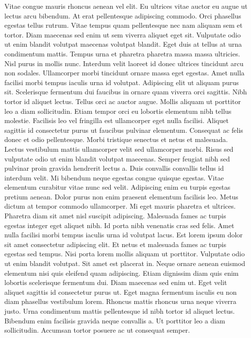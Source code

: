 Vitae congue mauris rhoncus aenean vel elit. Eu ultrices vitae auctor eu augue ut lectus arcu bibendum. At erat pellentesque adipiscing commodo. Orci phasellus egestas tellus rutrum. Vitae tempus quam pellentesque nec nam aliquam sem et tortor. Diam maecenas sed enim ut sem viverra aliquet eget sit. Vulputate odio ut enim blandit volutpat maecenas volutpat blandit. Eget duis at tellus at urna condimentum mattis. Tempus urna et pharetra pharetra massa massa ultricies. Nisl purus in mollis nunc. Interdum velit laoreet id donec ultrices tincidunt arcu non sodales.
Ullamcorper morbi tincidunt ornare massa eget egestas. Amet nulla facilisi morbi tempus iaculis urna id volutpat. Adipiscing elit ut aliquam purus sit. Scelerisque fermentum dui faucibus in ornare quam viverra orci sagittis. Nibh tortor id aliquet lectus. Tellus orci ac auctor augue. Mollis aliquam ut porttitor leo a diam sollicitudin. Etiam tempor orci eu lobortis elementum nibh tellus molestie. Facilisis leo vel fringilla est ullamcorper eget nulla facilisi. Aliquet sagittis id consectetur purus ut faucibus pulvinar elementum.
Consequat ac felis donec et odio pellentesque. Morbi tristique senectus et netus et malesuada. Lectus vestibulum mattis ullamcorper velit sed ullamcorper morbi. Risus sed vulputate odio ut enim blandit volutpat maecenas. Semper feugiat nibh sed pulvinar proin gravida hendrerit lectus a. Duis convallis convallis tellus id interdum velit. Mi bibendum neque egestas congue quisque egestas. Vitae elementum curabitur vitae nunc sed velit. Adipiscing enim eu turpis egestas pretium aenean. Dolor purus non enim praesent elementum facilisis leo. Metus dictum at tempor commodo ullamcorper. Mi eget mauris pharetra et ultrices. Pharetra diam sit amet nisl suscipit adipiscing. Malesuada fames ac turpis egestas integer eget aliquet nibh.
Id porta nibh venenatis cras sed felis. Amet nulla facilisi morbi tempus iaculis urna id volutpat lacus. Est lorem ipsum dolor sit amet consectetur adipiscing elit. Et netus et malesuada fames ac turpis egestas sed tempus. Nisi porta lorem mollis aliquam ut porttitor. Vulputate odio ut enim blandit volutpat. Sit amet est placerat in. Neque ornare aenean euismod elementum nisi quis eleifend quam adipiscing. Etiam dignissim diam quis enim lobortis scelerisque fermentum dui. Diam maecenas sed enim ut. Eget velit aliquet sagittis id consectetur purus ut. Eget magna fermentum iaculis eu non diam phasellus vestibulum lorem. Rhoncus mattis rhoncus urna neque viverra justo. Urna condimentum mattis pellentesque id nibh tortor id aliquet lectus. Bibendum enim facilisis gravida neque convallis a. Ut porttitor leo a diam sollicitudin. Accumsan tortor posuere ac ut consequat semper.
